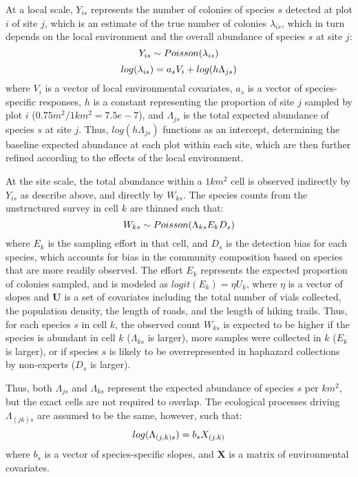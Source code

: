 \documentclass[10pt,a4paper,draft]{article}
\begin{document}
At a local scale, $Y_{is}$ represents the number of colonies of species $s$ detected at plot $i$ of site $j$, which is an estimate of the true number of colonies $\lambda_{is}$, which in turn depends on the local environment and the overall abundance of species $s$ at site $j$:
\begin{equation}
  Y_{is} \sim Poisson(\lambda_{is}) \\
\end{equation}
\begin{equation}
  log(\lambda_{is}) = a_s V_i + log(h\Lambda_{js}) \\
\end{equation}
where $V_i$ is a vector of local environmental covariates, $a_s$ is a vector of species-specific responses, $h$ is a constant representing the proportion of site $j$ sampled by plot $i$ ($0.75 m^2 / 1 km^2 = 7.5e-7$), and $\Lambda_{js}$ is the total expected abundance of species $s$ at site $j$. Thus, $log(h\Lambda_{js})$ functions as an intercept, determining the baseline expected abundance at each plot within each site, which are then further refined according to the effects of the local environment.

At the site scale, the total abundance within a $1 km^2$ cell is observed indirectly by $Y_{is}$ as describe above, and directly by $W_{ks}$. The species counts from the unstructured survey in cell $k$ are thinned such that:
\begin{equation}
  W_{ks} \sim Poisson(\Lambda_{ks}E_kD_s) \\
\end{equation}
where $E_k$ is the sampling effort in that cell, and $D_s$ is the detection bias for each species, which accounts for bias in the community composition based on species that are more readily observed. The effort $E_k$ represents the expected proportion of colonies sampled, and is modeled as $logit(E_k) = \eta U_k$, where $\eta$ is a vector of slopes and $\mathbf{U}$ is a set of covariates including the total number of vials collected, the population density, the length of roads, and the length of hiking trails. Thus, for each species $s$ in cell $k$, the observed count $W_{ks}$ is expected to be higher if the species is abundant in cell $k$ ($\Lambda_{ks}$ is larger), more samples were collected in $k$ ($E_k$ is larger), or if species $s$ is likely to be overrepresented in haphazard collections by non-experts ($D_s$ is larger).

Thus, both $\Lambda_{js}$ and $\Lambda_{ks}$ represent the expected abundance of species $s$ per $km^2$, but the exact cells are not required to overlap. The ecological processes driving $\Lambda_{(jk)s}$ are assumed to be the same, however, such that:
\begin{equation}
  log(\Lambda_{(j,k)s}) = b_s X_{(j,k)} \\
\end{equation}
where $b_s$ is a vector of species-specific slopes, and $\mathbf{X}$ is a matrix of environmental covariates. 
\end{document}
